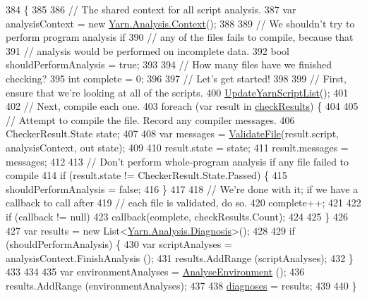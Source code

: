 \begin{DoxyCode}
384         \{
385 
386             \textcolor{comment}{// The shared context for all script analysis.}
387             var analysisContext = \textcolor{keyword}{new} \hyperlink{a00059}{Yarn.Analysis.Context}();
388 
389             \textcolor{comment}{// We shouldn't try to perform program analysis if}
390             \textcolor{comment}{// any of the files fails to compile, because that}
391             \textcolor{comment}{// analysis would be performed on incomplete data.}
392             \textcolor{keywordtype}{bool} shouldPerformAnalysis = \textcolor{keyword}{true};
393 
394             \textcolor{comment}{// How many files have we finished checking?}
395             \textcolor{keywordtype}{int} complete = 0;
396 
397             \textcolor{comment}{// Let's get started!}
398 
399             \textcolor{comment}{// First, ensure that we're looking at all of the scripts.}
400             \hyperlink{a00188_a406febf62d77eaabc235f6316e537345}{UpdateYarnScriptList}();
401 
402             \textcolor{comment}{// Next, compile each one.}
403             \textcolor{keywordflow}{foreach} (var result \textcolor{keywordflow}{in} \hyperlink{a00188_aa85ab7bd194e5425b991b9c216d4d10e}{checkResults}) \{
404 
405                 \textcolor{comment}{// Attempt to compile the file. Record any compiler messages.}
406                 CheckerResult.State state;
407 
408                 var messages = \hyperlink{a00188_a6f2bf42b228ea29c6477e369226db8b6}{ValidateFile}(result.script, analysisContext, out state);
409 
410                 result.state = state;
411                 result.messages = messages;
412 
413                 \textcolor{comment}{// Don't perform whole-program analysis if any file failed to compile}
414                 \textcolor{keywordflow}{if} (result.state != CheckerResult.State.Passed) \{
415                     shouldPerformAnalysis = \textcolor{keyword}{false};
416                 \}
417 
418                 \textcolor{comment}{// We're done with it; if we have a callback to call after}
419                 \textcolor{comment}{// each file is validated, do so.}
420                 complete++;
421 
422                 \textcolor{keywordflow}{if} (callback != null)
423                     callback(complete, checkResults.Count);
424 
425             \}
426 
427             var results = \textcolor{keyword}{new} List<\hyperlink{a00093}{Yarn.Analysis.Diagnosis}>();
428 
429             \textcolor{keywordflow}{if} (shouldPerformAnalysis) \{
430                 var scriptAnalyses = analysisContext.FinishAnalysis ();
431                 results.AddRange (scriptAnalyses);
432             \}
433 
434 
435             var environmentAnalyses = \hyperlink{a00188_a9c207786c349120dc439bdce53072191}{AnalyseEnvironment} ();
436             results.AddRange (environmentAnalyses);
437 
438             \hyperlink{a00188_a25c92cbfdd09661a96714d05b14af886}{diagnoses} = results;
439 
440         \}
\end{DoxyCode}

